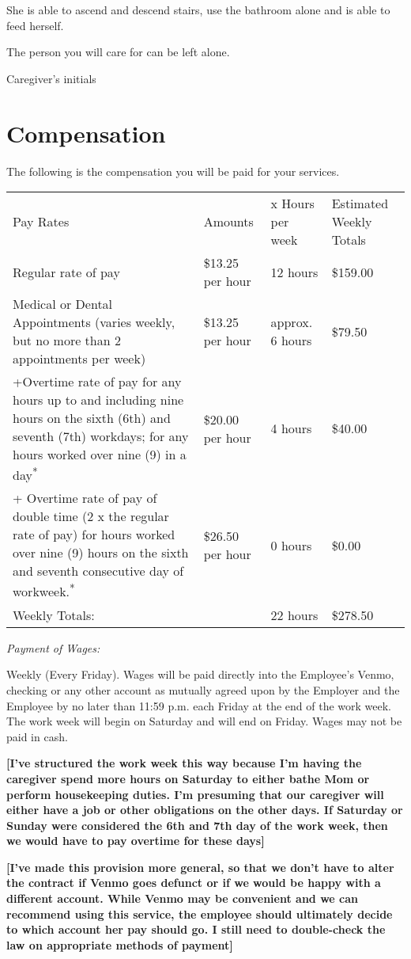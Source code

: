 \documentclass[]{article}
\newcommand{\initialfillin}{\hspace{0.2cm}\makebox[1.5cm]{\hrulefill}}
\begin{document}
She is able to ascend and descend stairs, use the bathroom alone and is able to feed herself.

The person you will care for can be left alone.

Caregiver's initials \initialfillin{}

\section{Compensation}

The following is the compensation you will be paid for your services.

\begin{tabular}[c]{@{}llll@{}}
\toprule
Pay Rates & Amounts & x Hours per week & Estimated Weekly
Totals\tabularnewline
Regular rate of pay & \$13.25 per hour & 12 hours &
\$159.00\tabularnewline
Medical or Dental Appointments (varies weekly, but no more than 2
appointments per week) & \$13.25 per hour & approx. 6 hours &
\$79.50\tabularnewline
+Overtime rate of pay for any hours up to and including nine hours on
the sixth (6th) and seventh (7th) workdays; for any hours worked over
nine (9) in a day\textsuperscript{*} & \$20.00 per hour & 4 hours &
\$40.00\tabularnewline
+ Overtime rate of pay of double time (2 x the regular rate of pay) for
hours worked over nine (9) hours on the sixth and seventh consecutive
day of workweek.\textsuperscript{*} & \$26.50 per hour & 0 hours &
\$0.00\tabularnewline
Weekly Totals: & & 22 hours & \$278.50\tabularnewline
\bottomrule
\end{tabular}

\emph{Payment of Wages:}

Weekly (Every Friday). Wages will be paid directly into the Employee's
Venmo, checking or any other account as mutually agreed upon by the
Employer and the Employee by no later than 11:59 p.m. each Friday at the
end of the work week. The work week will begin on Saturday and will end
on Friday. Wages may not be paid in cash.

\textbf{{[}I've structured the work week this way because I'm having the
caregiver spend more hours on Saturday to either bathe Mom or perform
housekeeping duties. I'm presuming that our caregiver will either have a
job or other obligations on the other days. If Saturday or Sunday were
considered the 6th and 7th day of the work week, then we would have to
pay overtime for these days{]}}

\textbf{{[}I've made this provision more general, so that we don't have
to alter the contract if Venmo goes defunct or if we would be happy with
a different account. While Venmo may be convenient and we can recommend
using this service, the employee should ultimately decide to which
account her pay should go. I still need to double-check the law on
appropriate methods of payment{]} }
\end{document}
